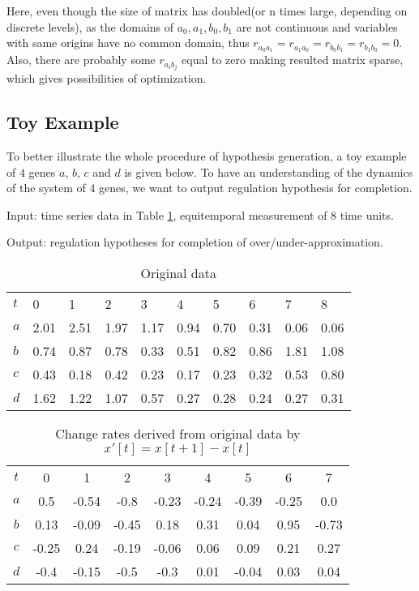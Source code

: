 Here, even though the size of matrix has doubled(or n times large, depending on discrete levels), as the domains of $a_0,a_1,b_0,b_1$ are not continuous and variables with same origins have no common domain, thus $r_{a_0a_1}=r_{a_1a_0}=r_{b_0b_1}=r_{b_1b_0}=0$. Also, there are probably some $r_{a_ib_j}$ equal to zero making resulted matrix sparse, which gives possibilities of optimization.
\subsection{Toy Example}
To better illustrate the whole procedure of hypothesis generation, a toy example of $4$ genes $a$, $b$, $c$ and $d$ is given below. To have an understanding of the dynamics of the system of 4 genes, we want to output regulation hypothesis for completion.\par
Input: time series data in Table \ref{TyTable1}, equitemporal measurement of 8 time units.\par
Output: regulation hypotheses for completion of over/under-approximation.\par

\begin{table}[!ht]
\centering
\begin{tabular}{*{10}{l}}
$t$&0&1&2&3&4&5&6&7&8\\
$a$&2.01&2.51&1.97&1.17&0.94&0.70&0.31&0.06&0.06\\
$b$&0.74&0.87&0.78&0.33&0.51&0.82&0.86&1.81&1.08\\
$c$&0.43&0.18&0.42&0.23&0.17&0.23&0.32&0.53&0.80\\
$d$&1.62&1.22&1.07&0.57&0.27&0.28&0.24&0.27&0.31
\end{tabular} 
\caption{Original data}\label{TyTable1}
\end{table}



\begin{table}[!ht]
\centering
\begin{tabular}{c*{8}{S}}
$t$&0&1&2&3&4&5&6&7\\
$a$&0.5&-0.54&-0.8&-0.23&-0.24&-0.39&-0.25&0.0\\
$b$&0.13&-0.09&-0.45&0.18&0.31&0.04&0.95&-0.73\\
$c$&-0.25&0.24&-0.19&-0.06&0.06&0.09&0.21&0.27\\
$d$&-0.4&-0.15&-0.5&-0.3&0.01&-0.04&0.03&0.04
\end{tabular} 
\caption{Change rates derived from original data by $x'[t]=x[t+1]-x[t]$}\label{TyTable2}
\end{table}

